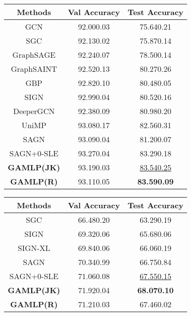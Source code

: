\documentclass[sigconf]{acmart}
\begin{document}
\begin{table}[tpb!]
     \centering
    \label{tab:products_perf}
     \begin{tabular}{c|cc}
    \toprule
    \textbf{Methods} & \textbf{Val Accuracy} & \textbf{Test Accuracy} \\
    \midrule
    GCN & 92.000.03 & 75.640.21 \\
    SGC & 92.130.02 & 75.870.14 \\
    GraphSAGE & 92.240.07 & 78.500.14 \\
    GraphSAINT & 92.520.13 & 80.270.26 \\
    GBP & 92.820.10 & 80.480.05 \\       
    SIGN & 92.990.04 & 80.520.16 \\
    DeeperGCN & 92.380.09 & 80.980.20 \\
    UniMP & 93.080.17 & 82.560.31 \\
    SAGN & 93.090.04 & 81.200.07 \\
    SAGN+0-SLE & 93.270.04 & 83.290.18\\
    \midrule
    \textbf{GAMLP(JK)} & 93.190.03 & \underline{83.540.25}  \\
    \textbf{GAMLP(R)} & 93.110.05 & \textbf{83.590.09}  \\
    \bottomrule
    \end{tabular}
    \vspace{-3mm}
\end{table}


\begin{table}[tpb!]
 \centering
\label{tab:100m_perf}
 \begin{tabular}{c|cc}
\toprule
\textbf{Methods} & \textbf{Val Accuracy} & \textbf{Test Accuracy} \\
\midrule
SGC & 66.480.20 & 63.290.19 \\
SIGN & 69.320.06 & 65.680.06 \\
SIGN-XL & 69.840.06 & 66.060.19 \\
SAGN & 70.340.99 & 66.750.84 \\
SAGN+0-SLE & 71.060.08 & \underline{67.550.15}\\
\midrule
\textbf{GAMLP(JK)} & 71.920.04 & \textbf{68.070.10}  \\
\textbf{GAMLP(R)} & 71.210.03 & 67.460.02  \\
\bottomrule
\end{tabular}
\vspace{-3mm}
\end{table}
  
\end{document}
